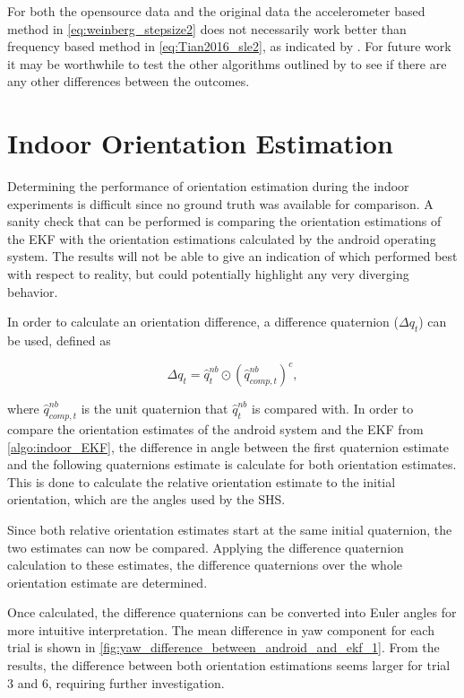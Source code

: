 For both the opensource data and the original data the accelerometer based method in \eqref{eq:weinberg_stepsize2} does not necessarily work better than frequency based method in \eqref{eq:Tian2016_sle2}, as indicated by \citet{Vezocnik2019}. For future work it may be worthwhile to test the other algorithms outlined by \cite{Vezocnik2019} to see if there are any other differences between the outcomes. 

\section{Indoor Orientation Estimation}

Determining the performance of orientation estimation during the indoor experiments is difficult since no ground truth was available for comparison. A sanity check that can be performed is comparing the orientation estimations of the EKF with the orientation estimations calculated by the android operating system. The results will not be able to give an indication of which performed best with respect to reality, but could potentially highlight any very diverging behavior. \par 

In order to calculate an orientation difference, a difference quaternion ($	\Delta q_t$) can be used, defined as \cite{Kok2017}

\begin{equation}
	\Delta q_t = \hat{q}_{t}^{nb} \odot \left( \hat{q}_{comp,t}^{nb}  \right)^c,
\end{equation} 

where $\hat{q}_{comp,t}^{nb}$ is the unit quaternion that $ \hat{q}_{t}^{nb} $ is compared with.  In order to compare the orientation estimates of the android system and the EKF from \cref{algo:indoor_EKF}, the difference in angle between the first quaternion estimate and the following quaternions estimate is calculate for both orientation estimates. This is done to calculate the relative orientation estimate to the initial orientation, which are the angles used by the \ac{SHS}.\par 

Since both relative orientation estimates start at the same initial quaternion, the two estimates can now be compared. Applying the difference quaternion calculation to these estimates, the difference quaternions over the whole orientation estimate are determined.  \par 

Once calculated, the difference quaternions can be converted into Euler angles for more intuitive interpretation. The mean difference in yaw component for each trial is shown in  \cref{fig:yaw_difference_between_android_and_ekf_1}. From the results, the difference between both orientation estimations seems larger for trial 3 and 6, requiring further investigation.

